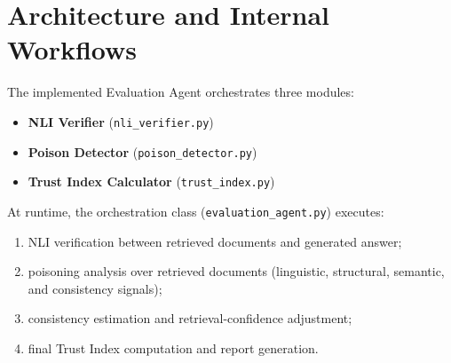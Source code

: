 \section{Architecture and Internal Workflows}

The implemented Evaluation Agent orchestrates three modules:
\begin{itemize}
    \item \textbf{NLI Verifier} (\texttt{nli\_verifier.py})
    \item \textbf{Poison Detector} (\texttt{poison\_detector.py})
    \item \textbf{Trust Index Calculator} (\texttt{trust\_index.py})
\end{itemize}

At runtime, the orchestration class (\texttt{evaluation\_agent.py}) executes:
\begin{enumerate}
    \item NLI verification between retrieved documents and generated answer;
    \item poisoning analysis over retrieved documents (linguistic, structural, semantic, and consistency signals);
    \item consistency estimation and retrieval-confidence adjustment;
    \item final Trust Index computation and report generation.
\end{enumerate}

